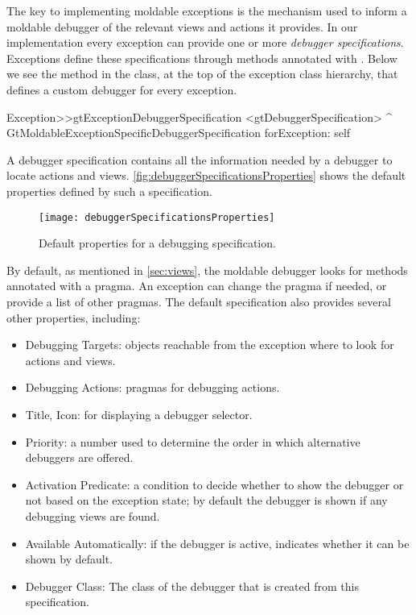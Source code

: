 \documentclass[sigplan,10pt]{acmart}
\newcommand{\GT}{\lst{GT}\xspace} %
\begin{document}
The key to implementing moldable exceptions is the mechanism used to inform a moldable debugger of the relevant views and actions it provides.
In our implementation every exception can provide one or more \emph{debugger specifications}.
Exceptions define these specifications through methods annotated with .
Below we see the method in the  class, at the top of the exception class hierarchy, that defines a custom debugger for every exception.

\begin{code}
Exception>>gtExceptionDebuggerSpecification
	<gtDebuggerSpecification>
	^ GtMoldableExceptionSpecificDebuggerSpecification
		forException: self
\end{code}

A debugger specification contains all the information needed by a debugger to locate actions and views.
\autoref{fig:debuggerSpecificationsProperties} shows the default properties defined by such a specification.

\begin{figure}[h]
  \texttt{[image: debuggerSpecificationsProperties]}
  \caption{Default properties for a debugging specification.}
  \label{fig:debuggerSpecificationsProperties}
\end{figure}

By default, as mentioned in \autoref{sec:views}, the moldable \GT debugger looks for methods annotated with a  pragma.
An exception can change the pragma if needed, or provide a list of other pragmas.
The default specification also provides several other properties, including:
\begin{itemize}
\item Debugging Targets: objects reachable from the exception where to look for actions and views.
\item Debugging Actions: pragmas for debugging actions.
\item Title, Icon: for displaying a debugger selector.
\item Priority: a number used to determine the order in which alternative debuggers are offered.
\item Activation Predicate: a condition to decide whether to show the debugger or not based on the exception state; by default the debugger is shown if any debugging views are found.
\item Available Automatically: if the debugger is active, indicates whether it can be shown by default.
\item Debugger Class: The class of the debugger that is created from this specification.
\end{itemize}
\end{document}
